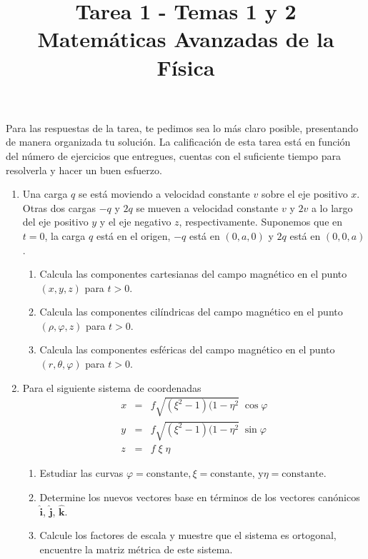 \documentclass[12pt]{article}
\title{Tarea 1 - Temas 1 y 2 \\ \large{Matemáticas Avanzadas de la Física}}
\date{ }
\begin{document}
\vspace{-4cm}
\renewcommand\labelenumii{\theenumi.{\arabic{enumii}}}
\maketitle
\fontsize{14}{14}\selectfont
Para las respuestas de la tarea, te pedimos sea lo más claro posible, presentando de manera organizada tu solución. La calificación de esta tarea está en función del número de ejercicios que entregues, cuentas con el suficiente tiempo para resolverla y hacer un buen esfuerzo.
\begin{enumerate}
\item Una carga $q$ se está moviendo a velocidad constante $v$ sobre el eje positivo $x$. Otras dos cargas $-q$ y $2q$ se mueven a velocidad constante $v$ y $2v$ a lo largo del eje positivo $y$ y el eje negativo $z$, respectivamente. Suponemos que en $t=0$, la carga $q$ está en el origen, $-q$ está en $(0,a,0)$ y $2q$ está en $(0,0,a)$.
\begin{enumerate}
\item Calcula las componentes cartesianas del campo magnético en el punto $(x,y,z)$ para $t>0$.
\item Calcula las componentes cilíndricas del campo magnético en el punto $(\rho, \varphi, z)$ para $t>0$.
\item Calcula las componentes esféricas del campo magnético en el punto $(r, \theta, \varphi)$ para $t>0$.
\end{enumerate}
\item Para el siguiente sistema de coordenadas
\begin{eqnarray*}
x &=& f \sqrt{(\xi^{2} -1) (1 - \eta^{2}} \; \cos \varphi \nonumber \\
y &=& f \sqrt{(\xi^{2} -1) (1 - \eta^{2}} \; \sin \varphi \nonumber \\
z &=& f \; \xi \; \eta \nonumber
\end{eqnarray*}
\begin{enumerate}
\item Estudiar las curvas $\varphi = \mbox{constante}, \xi = \mbox{constante, y} \eta = \mbox{constante}$.
\item Determine los nuevos vectores base en términos de los vectores canónicos $\mathbf{\widehat{i}}$, $\mathbf{\widehat{j}}$, $\mathbf{\widehat{k}}$.
\item Calcule los factores de escala y muestre que el sistema es ortogonal, encuentre la matriz métrica de este sistema.

\end{enumerate}
\end{enumerate}
\end{document}
